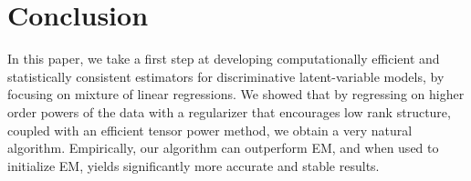 \section{Conclusion}
\label{sec:conclusion}

In this paper, we take a first step at developing computationally efficient and
statistically consistent estimators for discriminative latent-variable models,
by focusing on mixture of linear regressions.  We showed that by regressing on
higher order powers of the data with a regularizer that encourages low rank
structure, coupled with an efficient tensor power method, we obtain a very natural algorithm.
Empirically, our algorithm can outperform EM, and when used to initialize EM,
yields significantly more accurate and stable results.
